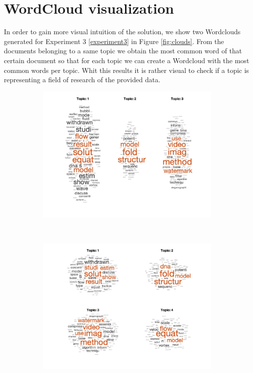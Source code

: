 \documentclass[12pt]{article}
\begin{document}
\section{WordCloud visualization}

In order to gain more visual intuition of the solution, we show two Wordclouds generated for Experiment 3 \ref{experiment3} in Figure \ref{fig:clouds}. From the documents belonging to a same topic we obtain the most common word of that certain document so that for each topic we can create a Wordcloud with the most common words per topic. Whit this results it is rather visual to check if a topic is representing a field of research of the provided data.

\begin{figure}[h]
	\centering
	\begin{subfigure}{0.4\textwidth}
		\includegraphics[width=\textwidth]{images/MAP/wordcloud_MAP3_topics.jpg}
		\caption{}
		\label{fig:cloud_3}
	\end{subfigure}
	~	
	\begin{subfigure}{0.4\textwidth}
		\includegraphics[width=\textwidth]{images/MAP/wordcloud_MAP4_topics.jpg}

\end{subfigure}
\end{figure}
\end{document}
